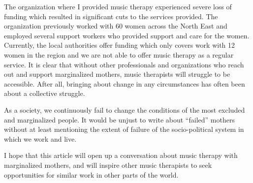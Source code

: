 \documentclass[authordate, empirical]{jote-new-article}
\begin{document}
The organization where I provided music therapy experienced severe loss of funding which resulted in significant cuts to the services provided. The organization previously worked with 60 women across the North East and employed several support workers who provided support and care for the women. Currently, the local authorities offer funding which only covers work with 12 women in the region and we are not able to offer music therapy as a regular service. It is clear that without other professionals and organizations who reach out and support marginalized mothers, music therapists will struggle to be accessible. After all, bringing about change in any circumstances has often been about a collective struggle.







As a society, we continuously fail to change the conditions of the most excluded and marginalized people. It would be unjust to write about “failed” mothers without at least mentioning the extent of failure of the socio-political system in which we work and live.



I hope that this article will open up a conversation about music therapy with marginalized mothers, and will inspire other music therapists to seek opportunities for similar work in other parts of the world.
\end{document}
